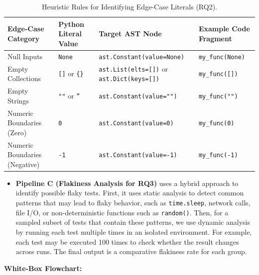 \documentclass[conference]{IEEEtran}
\begin{document}
\begin{table}[h!]
\centering
\caption{Heuristic Rules for Identifying Edge-Case Literals (RQ2).}
\begin{tabular}{|p{3.5cm}|p{3.5cm}|p{5cm}|p{5cm}|}
\hline
\textbf{Edge-Case Category} &
\textbf{Python Literal Value} &
\textbf{Target AST Node} &
\textbf{Example Code Fragment} \\
\hline

Null Inputs &
\texttt{None} &
\texttt{ast.Constant(value=None)} &
\texttt{my\_func(None)} \\
\hline

Empty Collections &
\texttt{[]} or \texttt{\{\}} &
\texttt{ast.List(elts=[])} or \texttt{ast.Dict(keys=[])} &
\texttt{my\_func([])} \\
\hline

Empty Strings &
\texttt{""} or \texttt{''} &
\texttt{ast.Constant(value="")} &
\texttt{my\_func("")} \\
\hline

Numeric Boundaries (Zero) &
\texttt{0} &
\texttt{ast.Constant(value=0)} &
\texttt{my\_func(0)} \\
\hline

Numeric Boundaries (Negative) &
\texttt{-1} &
\texttt{ast.Constant(value=-1)} &
\texttt{my\_func(-1)} \\
\hline

\end{tabular}
\end{table}

\begin{itemize}
    \item \textbf{Pipeline C (Flakiness Analysis for RQ3)} uses a hybrid approach to identify possible flaky tests. First, it uses static analysis to detect common patterns that may lead to flaky behavior, such as \texttt{time.sleep}, network calls, file I/O, or non-deterministic functions such as \texttt{random()}. Then, for a sampled subset of tests that contain these patterns, we use dynamic analysis by running each test multiple times in an isolated environment. For example, each test may be executed 100 times to check whether the result changes across runs. The final output is a comparative flakiness rate for each group.
\end{itemize}

\textbf{White-Box Flowchart:}
\end{document}
